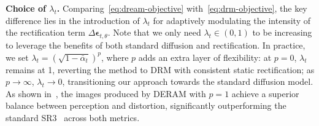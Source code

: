 
\textbf{Choice of $\lambda_t$.} Comparing~\cref{eq:dream-objective} with~\cref{eq:drm-objective}, the key difference lies in the introduction of $\lambda_t$ for adaptively modulating the intensity of the rectification term $\Delta\bm\epsilon_{t,\theta}$. Note that we only need $\lambda_t\in(0,1)$ to be increasing to leverage the benefits of both standard diffusion and rectification. In practice, we set $\lambda_t=(\sqrt{1-\bar{\alpha}_t})^{p}$, where $p$ adds an extra layer of flexibility: at $p=0$, $\lambda_t$ remains at 1, reverting the method to DRM with consistent static rectification; as $p\to\infty$, $\lambda_t\to0$, transitioning our approach towards the standard diffusion model. As shown in~, the images produced by DERAM with $p=1$ achieve a superior balance between perception and distortion, significantly outperforming the standard SR3~\cite{saharia2022image} across both metrics.



